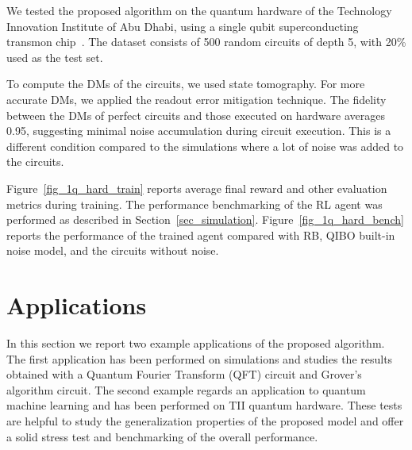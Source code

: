 \documentclass[sn-basic]{sn-jnl} %
\begin{document}
We tested the proposed algorithm on the quantum hardware of the Technology Innovation Institute of Abu Dhabi, 
using a single qubit superconducting transmon chip~\cite{doi:10.1126/science.1231930}. The dataset consists 
of 500 random circuits of depth 5, with 20\% used as the test set. 

To compute the DMs of the circuits, we used state tomography. For more accurate DMs, we applied the readout 
error mitigation technique. The fidelity between the DMs of perfect circuits and those executed on hardware 
averages 0.95, suggesting minimal noise accumulation during circuit execution. This is a different condition 
compared to the simulations where a lot of noise was added to the circuits. 

Figure~\ref{fig_1q_hard_train} reports average final reward and other evaluation metrics during training. 
The performance benchmarking of the RL agent was performed as described in Section~\ref{sec_simulation}. 
Figure~\ref{fig_1q_hard_bench} reports the performance of the trained agent compared with RB, QIBO built-in 
noise model, and the circuits without noise.
\newpage
\section{Applications} \label{sec_applications}
In this section we report two example applications of the proposed algorithm. The first application has been performed on simulations and studies the results obtained with a Quantum Fourier Transform (QFT) circuit and Grover's algorithm circuit. The second example regards an application to quantum machine learning and has been performed on TII quantum hardware. These tests are helpful to study the generalization properties of the proposed model and offer a solid stress test and benchmarking of the overall performance.
\end{document}
